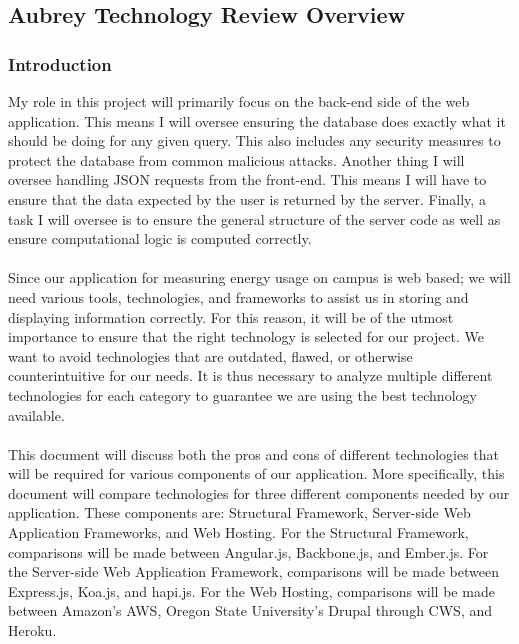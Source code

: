 \subsection{Aubrey Technology Review Overview}
\subsubsection{Introduction}
	My role in this project will primarily focus on the back-end side of the web application. This means I will oversee ensuring the database does exactly what it should be doing for any given query. This also includes any security measures to protect the database from common malicious attacks. Another thing I will oversee handling JSON requests from the front-end. This means I will have to ensure that the data expected by the user is returned by the server. Finally, a task I will oversee is to ensure the general structure of the server code as well as ensure computational logic is computed correctly.\\\\
	Since our application for measuring energy usage on campus is web based; we will need various tools, technologies, and frameworks to assist us in storing and displaying information correctly. For this reason, it will be of the utmost importance to ensure that the right technology is selected for our project. We want to avoid technologies that are outdated, flawed, or otherwise counterintuitive for our needs. It is thus necessary to analyze multiple different technologies for each category to guarantee we are using the best technology available.\\\\
This document will discuss both the pros and cons of different technologies that will be required for various components of our application. More specifically, this document will compare technologies for three different components needed by our application. These components are: Structural Framework, Server-side Web Application Frameworks, and Web Hosting. For the Structural Framework, comparisons will be made between Angular.js, Backbone.js, and Ember.js. For the Server-side Web Application Framework, comparisons will be made between Express.js, Koa.js, and hapi.js. For the Web Hosting, comparisons will be made between Amazon's AWS, Oregon State University's Drupal through CWS, and Heroku.



